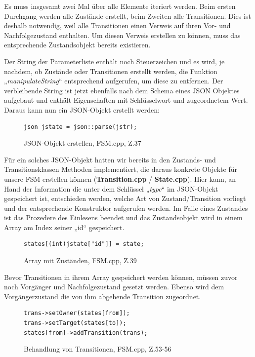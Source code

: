 Es muss insgesamt zwei Mal über alle Elemente iteriert werden. Beim ersten
Durchgang werden alle Zustände erstellt, beim Zweiten alle Transitionen. Dies
ist deshalb notwendig, weil alle Transitionen einen Verweis auf ihren Vor- und
Nachfolgezustand enthalten. Um diesen Verweis erstellen zu können, muss das
entsprechende Zustandsobjekt bereits existieren.

Der String der Parameterliste enthält noch Steuerzeichen und es wird, je
nachdem, ob Zustände oder Transitionen erstellt werden, die Funktion
„\textit{manipulateString}“ entsprechend aufgerufen, um diese zu entfernen. Der
verbleibende String ist jetzt ebenfalls nach dem Schema eines JSON Objektes
aufgebaut und enthält Eigenschaften mit Schlüsselwort und zugeordnetem Wert.
Daraus kann nun ein JSON-Objekt erstellt werden:

\begin{figure}[thp]
\begin{lstlisting}[style=json]
json jstate = json::parse(jstr);

\end{lstlisting}

\centering
\caption{JSON-Objekt erstellen, FSM.cpp, Z.37}
\end{figure}


Für ein solches JSON-Objekt hatten wir bereits in den Zustands- und
Transitionsklassen Methoden implementiert, die daraus konkrete Objekte für unsere
FSM erstellen können (\textbf{Transition.cpp} / \textbf{State.cpp}).
Hier kann, an Hand der Information die unter dem Schlüssel „\textit{type}“ im JSON-Objekt
gespeichert ist, entschieden werden, welche Art von Zustand/Transition vorliegt
und der entsprechende Konstruktor aufgerufen werden.
Im Falle eines Zustandes ist das Prozedere des Einlesens beendet und das
Zustandsobjekt wird in einem Array am Index seiner „id“ gespeichert.

\begin{figure}[thp]
\begin{lstlisting}[style=json]
states[(int)jstate["id"]] = state;

\end{lstlisting}
\centering
\caption{Array mit Zuständen, FSM.cpp, Z.39}
\end{figure}



Bevor Transitionen in ihrem Array gespeichert werden können, müssen zuvor noch
Vorgänger und Nachfolgezustand gesetzt werden. Ebenso wird dem Vorgängerzustand
die von ihm abgehende Transition zugeordnet.

\begin{figure}[thp]
\begin{lstlisting}[style=json]
trans->setOwner(states[from]);
trans->setTarget(states[to]);
states[from]->addTransition(trans);

\end{lstlisting}
\centering
\caption{Behandlung von Transitionen, FSM.cpp, Z.53-56}
\end{figure}

